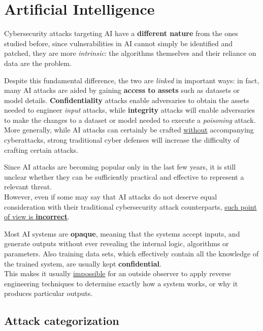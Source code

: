 \chapter{Artificial Intelligence}

Cybersecurity attacks targeting AI have a \textbf{different nature} from the ones studied before, since vulnerabilities in AI cannot simply be identified and patched, 
they are more \textit{intrinsic}:
the algorithms themselves and their reliance on data are the problem.

Despite this fundamental difference, the two are \textit{linked} in important ways:
in fact, many AI attacks are aided by gaining \textbf{access to assets} such as datasets or model details.
\textbf{Confidentiality} attacks  enable adversaries to obtain the assets needed to engineer \textit{input} attacks,
while \textbf{integrity} attacks will enable adversaries to make the changes to a dataset or model needed to execute a \textit{poisoning} attack.\\
More generally, while AI attacks can certainly be crafted \underline{without} accompanying cyberattacks,
strong traditional cyber defenses will increase the difficulty of crafting certain attacks.

\nl

Since AI attacks are becoming popular only in the last few years,
it is still unclear whether they can be sufficiently practical and effective to represent a relevant threat.\\
However, even if some may say that AI attacks do not deserve equal consideration with
their traditional cybersecurity attack counterparts, \underline{such point of view is \textbf{incorrect}}.

\nl

Most AI systems are \textbf{opaque}, meaning that the systems accept inputs, and generate
outputs without ever revealing the internal logic, algorithms or parameters.
Also training data sets, which effectively contain all the knowledge of the
trained system, are usually kept \textbf{confidential}.\\
This makes it usually \underline{impossible} for an outside observer to apply reverse engineering techniques to determine exactly how a system works, or why it produces particular outputs.

\section{Attack categorization}
